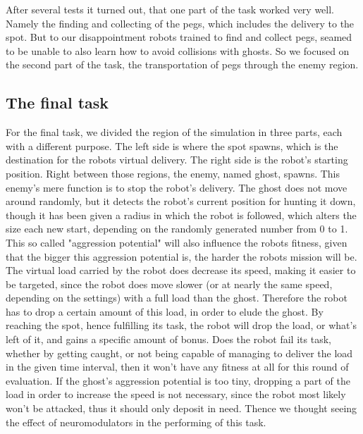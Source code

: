 \documentclass[12pt,fleqn,a4paper]{article}
\begin{document}
After several tests it turned out, that one part of the task worked very well. Namely the finding and collecting of the pegs, which includes the delivery to the spot. But to our disappointment robots trained to find and collect pegs, seamed to be unable to also learn how to avoid collisions with ghosts. So we focused on the second part of the task, the transportation of pegs through the enemy region.

\subsection{The final task}
For the final task, we divided the region of the simulation in three parts, each with a different purpose. The left side is where the spot spawns, which is the destination for the robots virtual delivery. The right side is the robot's
starting position. Right between those regions, the enemy, named ghost, spawns. This enemy's mere function is to stop the robot's delivery. The ghost does not move around randomly, but it detects the robot's current position for hunting it down, though it has been given a radius in which the robot is followed, which alters the size each new start, depending on the randomly generated number from 0 to 1. This so called "aggression potential" will also influence the robots fitness, given that the bigger this aggression potential is, the harder the robots mission will be. The virtual load carried by the robot does decrease its speed, making it easier to be targeted, since the robot does move slower (or at nearly the same speed, depending on the settings) with a full load than the ghost. Therefore the robot has to drop a certain amount of this load, in order to elude the ghost. By reaching the spot, hence fulfilling its task, the robot will drop the load, or what's left of it, and gains a specific amount of bonus. Does the robot fail its task, whether by getting caught, or not being capable of managing to deliver the load in the given time interval, then it won't have any fitness at all for this round of evaluation. If the ghost's aggression potential is too tiny, dropping a part of the load in order to increase the speed is not necessary, since the robot most likely won't be attacked, thus it should only deposit in need. Thence we thought seeing the effect of neuromodulators in the performing of this task.
\end{document}
